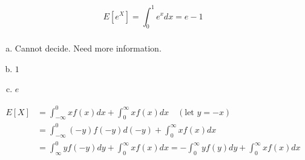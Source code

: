 \documentclass[slidestop,compress,mathserif]{beamer}
\begin{document}

\begin{frame}
\pause


$$E[e^X]  = \int_{0}^{1} e^x dx =  e - 1$$

\end{frame}


\begin{frame}\frametitle{}


\begin{enumerate}[(a)]
\item Cannot decide. Need more information.
\item $1$
\item $e$
\end{enumerate}

\pause\vspace{-1cm}
\begin{align*}
E[X] & = \int_{-\infty}^0 xf(x)dx + \int_0^{\infty} xf(x)dx \quad (\text{let } y = -x)\\
& = \int_{-\infty}^0 (-y)f(-y)d(-y) + \int_0^{\infty} xf(x)dx\\
& = \int_{\infty}^0 yf(-y)dy + \int_0^{\infty} xf(x)dx
= -\int^{\infty}_0 yf(y)dy + \int_0^{\infty} xf(x)dx
\end{align*}


\end{frame}
\end{document}
